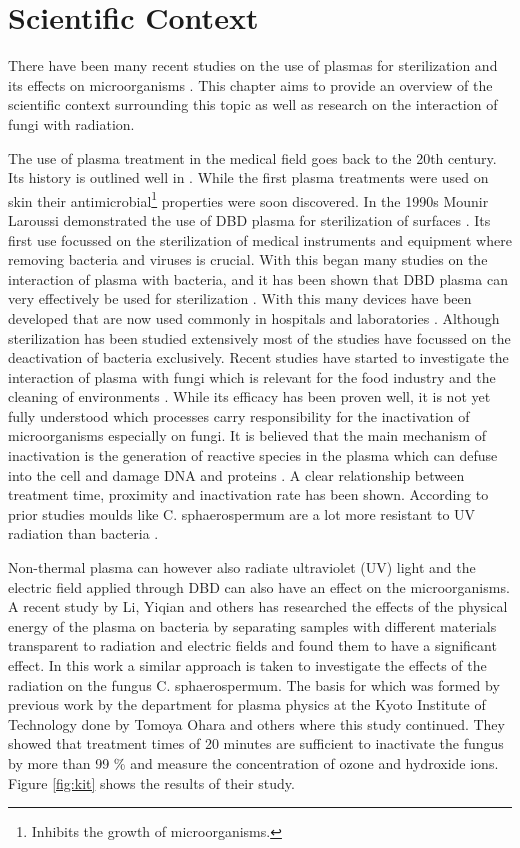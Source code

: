 \chapter{Scientific Context}
\label{chap:scientific_context}
There have been many recent studies on the use of plasmas for sterilization and its effects on microorganisms \cite{bacteria, app_study, kit, wound,inactivation}. This chapter aims to provide an overview of the scientific context surrounding this topic as well as research on the interaction of fungi with radiation.

The use of plasma treatment in the medical field goes back to the 20th century. Its history is outlined well in \cite{history}. While the first plasma treatments were used on skin their antimicrobial\footnote{Inhibits the growth of microorganisms.} properties were soon discovered. In the 1990s Mounir Laroussi demonstrated the use of DBD plasma for sterilization of surfaces \cite{laroussi}. Its first use focussed on the sterilization of medical instruments and equipment where removing bacteria and viruses is crucial. With this began many studies on the interaction of plasma with bacteria, and it has been shown that DBD plasma can very effectively be used for sterilization \cite{inactivation, app_study}. With this many devices have been developed that are now used commonly in hospitals and laboratories \cite{history}. Although sterilization has been studied extensively most of the studies have focussed on the deactivation of bacteria exclusively. Recent studies have started to investigate the interaction of plasma with fungi which is relevant for the food industry and the cleaning of environments  \cite{growth}. While its efficacy has been proven well, it is not yet fully understood which processes carry responsibility for the inactivation of microorganisms especially on fungi. It is believed that the main mechanism of inactivation is the generation of reactive species in the plasma which can defuse into the cell and damage DNA and proteins \cite{app_study, inactivation}. A clear relationship between treatment time, proximity and inactivation rate has been shown. According to prior studies moulds like C. sphaerospermum are a lot more resistant to UV radiation than bacteria \cite{app_study}. 

Non-thermal plasma can however also radiate ultraviolet (UV) light and the electric field applied through DBD can also have an effect on the microorganisms. A recent study by Li, Yiqian and others \cite{bacteria} has researched the effects of the physical energy of the plasma on bacteria by separating samples with different materials transparent to radiation and electric fields and found them to have a significant effect. In this work a similar approach is taken to investigate the effects of the radiation on the fungus C. sphaerospermum. The basis for which was formed by previous work by the department for plasma physics at the Kyoto Institute of Technology done by Tomoya Ohara and others \cite{kit} where this study continued. They showed that treatment times of 20 minutes are sufficient to inactivate the fungus by more than 99 \% and measure the concentration of ozone and hydroxide ions. Figure \ref{fig:kit} shows the results of their study.

